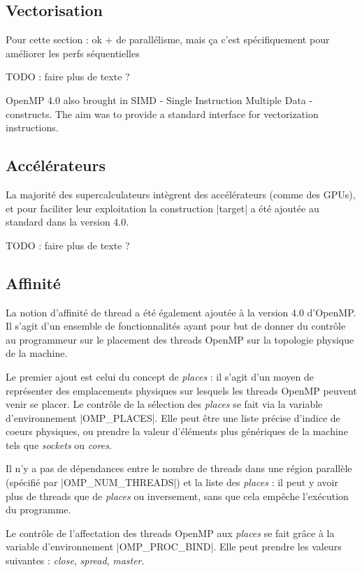 \subsection{Vectorisation}



Pour cette section : ok + de parallélisme, mais ça c'est spécifiquement pour améliorer les perfs séquentielles

TODO : faire plus de texte ?

OpenMP 4.0 also brought in SIMD - Single Instruction Multiple Data - constructs.
The aim was to provide a standard interface for vectorization instructions.


\subsection{Accélérateurs}

La majorité des supercalculateurs intègrent des accélérateurs (comme des GPUs), et pour faciliter leur exploitation la construction |target| a été ajoutée au standard dans la version 4.0.

TODO : faire plus de texte ?

\subsection{Affinité}

La notion d'affinité de thread a été également ajoutée à la version 4.0 d'OpenMP.
Il s'agit d'un ensemble de fonctionnalités ayant pour but de donner du contrôle au programmeur sur le placement des threads OpenMP sur la topologie physique de la machine.

Le premier ajout est celui du concept de \emph{places} : il s'agit d'un moyen de représenter des emplacements physiques sur lesquels les threads OpenMP peuvent venir se placer.
Le contrôle de la sélection des \emph{places} se fait via la variable d'environnement |OMP_PLACES|.
Elle peut être une liste précise d'indice de coeurs physiques, ou prendre la valeur d'éléments plus génériques de la machine tels que \emph{sockets} ou \emph{cores}.

Il n'y a pas de dépendances entre le nombre de threads dans une région parallèle (spécifié par |OMP_NUM_THREADS|) et la liste des \emph{places} : il peut y avoir plus de threads que de \emph{places} ou inversement, sans que cela empêche l'exécution du programme.

Le contrôle de l'affectation des threads OpenMP aux \emph{places} se fait grâce à la variable d'environnement |OMP_PROC_BIND|.
Elle peut prendre les valeurs suivantes : \emph{close}, \emph{spread}, \emph{master}.

